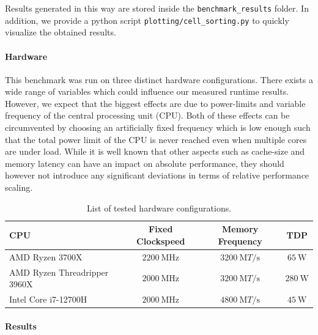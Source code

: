 \documentclass[fontsize=11pt,a4paper]{article}
\begin{document}
Results generated in this way are stored inside the \texttt{benchmark\_results} folder.
In addition, we provide a python script \texttt{plotting/cell\_sorting.py} to quickly visualize
the obtained results.

\paragraph{Hardware}
This benchmark was run on three distinct hardware configurations.
There exists a wide range of variables which could influence our measured runtime results.
However, we expect that the biggest effects are due to power-limits and variable frequency of the
central processing unit (CPU).
Both of these effects can be circumvented by choosing an artificially fixed frequency which is low
enough such that the total power limit of the CPU is never reached even when multiple cores are
under load.
While it is well known that other aspects such as cache-size and memory latency can have an impact
on absolute performance, they should however not introduce any significant deviations in terms of
relative performance scaling.

\begin{table}
    \centering
    \begin{tabular}{l c c c}
        CPU & Fixed Clockspeed & Memory Frequency & TDP\\
        \hline
        AMD Ryzen 3700X~\cite{AMDProductSpecifications} & $\SI{2200}{\mega\hertz}$
            & $\SI{3200}{\mega T\per\second}$ & $\SI{65}{\watt}$\\
        AMD Ryzen Threadripper 3960X~\cite{AMDProductSpecifications} & $\SI{2000}{\mega\hertz}$
            & $\SI{3200}{\mega T\per\second}$ & $\SI{280}{\watt}$\\
        Intel Core i7-12700H~\cite{Inteli712700H} & $\SI{2000}{\mega\hertz}$
            & $\SI{4800}{\mega T\per\second}$
            & $\SI{45}{\watt}$\\
    \end{tabular}
    \caption{List of tested hardware configurations.}
    \label{tab:hardware-configurations}
\end{table}

\paragraph{Results}
\end{document}
